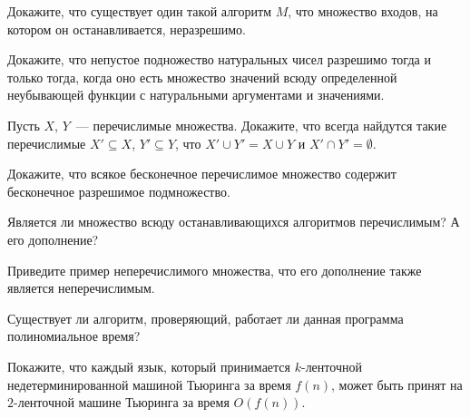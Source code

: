 \setcounter{curtask}{1}


\begin{task}
	Докажите, что существует один такой алгоритм $M$, что множество входов, на котором он останавливается, неразрешимо.    
\end{task}

\begin{task}
    Докажите, что непустое подножество натуральных чисел разрешимо тогда и только тогда, когда оно есть множество значений всюду
    определенной неубывающей функции с натуральными аргументами и значениями.
\end{task}

\begin{task}
    Пусть $X$, $Y$~--- перечислимые множества. Докажите, что всегда найдутся такие перечислимые $X' \subseteq X$, $Y' \subseteq
    Y$, что $X' \cup Y' = X \cup Y$ и $X' \cap Y' = \emptyset$.
\end{task}

\begin{task}
	Докажите, что всякое бесконечное перечислимое множество содержит бесконечное разрешимое подмножество. 
\end{task}

\begin{task}
    Является ли множество всюду останавливающихся алгоритмов перечислимым? А его дополнение?
\end{task}

\begin{task}
    Приведите пример неперечислимого множества, что его дополнение также является неперечислимым.
\end{task}

\begin{task}
    Существует ли алгоритм, проверяющий, работает ли данная программа полиномиальное время?
\end{task}

\begin{task}
    Покажите, что каждый язык, который принимается $k$-ленточной недетерминированной машиной Тьюринга за время $f(n)$, может быть
    принят на $2$-ленточной машине Тьюринга за время $O(f(n))$.
\end{task}